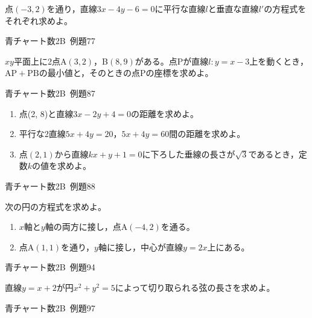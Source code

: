 \documentclass[b4paper, dvipdfmx, 11pt, fleqn, twocolumn, uplatex]{jsarticle}
\begin{document}

\begin{screen}
点$(-3,2)$を通り，直線$3x-4y-6=0$に平行な直線$l$と垂直な直線$l'$の方程式をそれぞれ求めよ。
\begin{flushright}
    青チャート数2B~例題77
\end{flushright}
\end{screen}


\begin{screen}
$xy$平面上に2点A$(3, 2)$，B$(8, 9)$がある。点Pが直線$l:y=x-3$上を動くとき，$\mathrm{AP}+\mathrm{PB}$の最小値と，そのときの点Pの座標を求めよ。
\begin{flushright}
    青チャート数2B~例題87
\end{flushright}
\end{screen}


\begin{screen}
\begin{enumerate}[label={(\arabic*)}]
\item 点(2, 8)と直線$3x-2y+4=0$の距離を求めよ。
\item 平行な2直線$5x+4y=20$，$5x+4y=60$間の距離を求めよ。
\item 点$(2,1)$から直線$kx+y+1=0$に下ろした垂線の長さが$\sqrt{3}$であるとき，定数$k$の値を求めよ。
\end{enumerate}
\begin{flushright}
    青チャート数2B~例題88
\end{flushright}
\end{screen}


\begin{screen}
次の円の方程式を求めよ。
\begin{enumerate}[label={(\arabic*)}]
\item $x$軸と$y$軸の両方に接し，点A$(-4, 2)$を通る。
\item 点A$(1, 1)$を通り，$y$軸に接し，中心が直線$y=2x$上にある。
\end{enumerate}
\begin{flushright}
    青チャート数2B~例題94
\end{flushright}
\end{screen}


\begin{screen}
直線$y=x+2$が円$x^2+y^2=5$によって切り取られる弦の長さを求めよ。
\begin{flushright}
    青チャート数2B~例題97
\end{flushright}
\end{screen}
\end{document}
